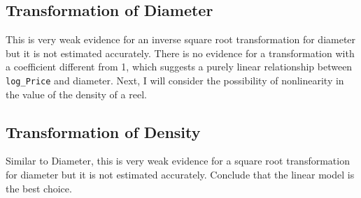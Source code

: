 \subsection{Transformation of Diameter}





This is very weak evidence for
an inverse square root transformation
for diameter but it is not estimated accurately.
%
There is no evidence for a transformation 
with a coefficient different from 1, 
which suggests
a purely linear relationship between \texttt{log\_Price}
and 
diameter.
Next, I will consider the possibility of nonlinearity 
in the value of the density of a reel. 

\subsection{Transformation of Density}




Similar to Diameter, this is very weak evidence for
a square root transformation
for diameter but it is not estimated accurately.
%
Conclude that the linear model is the best choice.






% 
